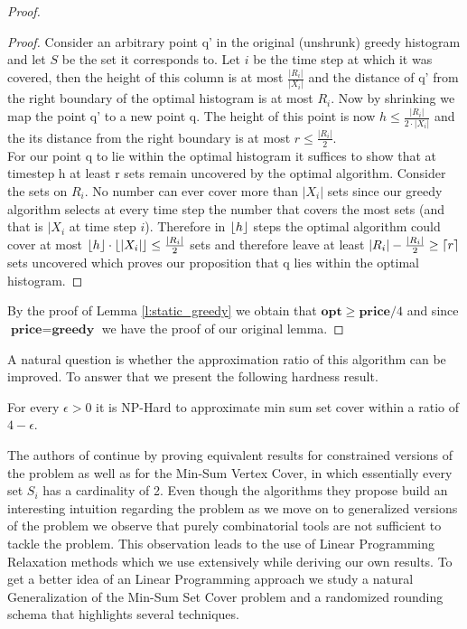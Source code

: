 \begin{proof}
\begin{proof}
        Consider an arbitrary point q' in the original (unshrunk) greedy histogram and let $S$ be the set it corresponds to. Let $i$ be the time step at which it was covered, then the height of this column is at most $\frac{|R_i|}{|X_i|}$ and the distance of q' from the right boundary of the optimal histogram is at most $R_i$. Now by shrinking we map the point q' to a new point q. The height of this point is now $h \leq \frac{|R_i|}{2 \cdot |X_i|}$ and the its distance from the right boundary is at most $r \leq \frac{|R_i|}{2}$. \\
        
        For our point q to lie within the optimal histogram it suffices to show that at timestep h at least r sets remain uncovered by the optimal algorithm. Consider the sets on $R_i$. No number can ever cover more than $|X_i|$ sets since our greedy algorithm selects at every time step the number that covers the most sets (and that is $|X_i$ at time step $i$). Therefore in $\lfloor h\rfloor$ steps the optimal algorithm could cover at most $\lfloor h\rfloor \cdot \lfloor|X_i|\rfloor \leq \frac{|R_i|}{2}$ sets and therefore leave at least $|R_i| - \frac{|R_i|}{2} \geq \lceil r\rceil$ sets uncovered which proves our proposition that q lies within the optimal histogram.
    \end{proof}
    
    By the proof of Lemma \ref{l:static_greedy} we obtain that $\textbf{opt} \geq \textbf{price} / 4$ and since $\textbf{price} = \textbf{greedy}$ we have the proof of our original lemma.
    
\end{proof}

A natural question is whether the approximation ratio of this algorithm can be improved. To answer that we present the following hardness result.

\begin{theorem}\label{t:mssc_hardness}
    For every $\epsilon > 0$ it is NP-Hard to approximate min sum set cover within a ratio of $4-\epsilon$.
\end{theorem}

The authors of \cite{FLT04} continue by proving equivalent results for constrained versions of the problem as well as for the Min-Sum Vertex Cover, in which essentially every set $S_i$ has a cardinality of 2. Even though the algorithms they propose build an interesting intuition regarding the problem as we move on to generalized versions of the problem we observe that purely combinatorial tools are not sufficient to tackle the problem. This observation leads to the use of Linear Programming Relaxation methods which we use extensively while deriving our own results. To get a better idea of an Linear Programming approach we study a natural Generalization of the Min-Sum Set Cover problem \cite{SW11} and a randomized rounding schema that highlights several techniques. 